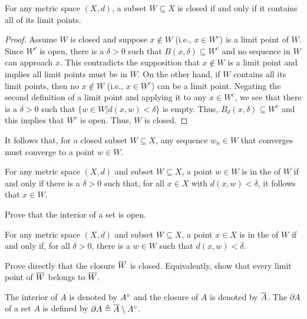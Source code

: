 \begin{theorem}
For any metric space $(X,d)$, a subset $W \subseteq X$ is closed if and only if it contains all of its limit points.
\end{theorem}

\begin{proof}
Assume $W$ is closed and suppose $x \notin W$ (i.e., $x \in W^c$) is a limit point of $W$.
Since $W^c$ is open, there is a $\delta > 0$ such that $B(x,\delta) \subseteq W^c$ and no sequence in $W$ can approach $x$. This contradicts the supposition that $x \notin W$ is a limit point and implies all limit points must be in $W$.
On the other hand, if $W$ contains all its limit points, then no $x \notin W$ (i.e., $x\in W^c$) can be a limit point.
Negating the second definition of a limit point and applying it to any $x \in W^c$, we see that there is a $\delta > 0$ such that $\{ w\in W | d(x,w)<\delta \}$ is empty.
Thus, $B_d (x,\delta) \subseteq W^c$ and this implies that $W^c$ is open.
Thus, $W$ is closed.
\end{proof}

It follows that, for a closed subset $W \subseteq X$, any sequence $w_n \in W$ that converges must converge to a point $w \in W$.

\begin{definition}
For any metric space $(X,d)$ and subset $W \subseteq X$, a point $w\in W$ is in the  of $W$ if and only if there is a $\delta >0$ such that, for all $x\in X$ with $d(x,w)<\delta$, it follows that $x\in W$.
\end{definition}

\begin{problem}
Prove that the interior of a set is open.
\end{problem}

\begin{definition}
For any metric space $(X,d)$ and subset $W \subseteq X$, a point $x\in X$ is in the  of $W$ if and only if, for all $\delta >0$, there is a $w\in W$ such that $d(x,w)<\delta$.
\end{definition}

\begin{problem}
Prove directly that the closure $\overline{W}$ is closed.
Equivalently, show that every limit point of $\overline{W}$ belongs to $\overline{W}$.
\end{problem}

The interior of $A$ is denoted by ${A}^{\circ}$ and the closure of $A$ is denoted by $\overline{A}$.
The  $\partial A$ of a set $A$ is defined by $\partial A \triangleq \overline{A} \setminus {A}^{\circ}$.

